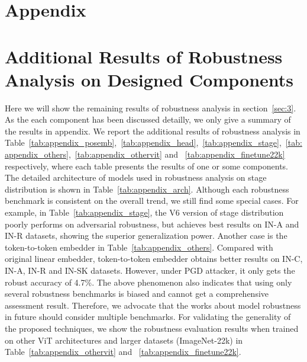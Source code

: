 \documentclass[10pt,twocolumn,letterpaper]{article}
\begin{document}
{\small


}

\clearpage

\appendix

\section*{Appendix}

\section{Additional Results of Robustness Analysis on Designed Components}

Here we will show the remaining results of robustness analysis in section~\ref{sec:3}. As the each component has been discussed detailly, we only give a summary of the results in appendix. We report the additional results of robustness analysis in Table~\ref{tab:appendix_posemb},~\ref{tab:appendix_head},~\ref{tab:appendix_stage},~\ref{tab:appendix_others},~\ref{tab:appendix_othervit} and ~\ref{tab:appendix_finetune22k} respectively, where each table presents the results of one or some components. The detailed architecture of models used in robustness analysis on stage distribution is shown in Table~\ref{tab:appendix_arch}. Although each robustness benchmark is consistent on the overall trend, we still find some special cases. For example, in Table~\ref{tab:appendix_stage}, the V6 version of stage distribution poorly performs on adversarial robustness, but achieves best results on IN-A and IN-R datasets, showing the superior generalization power. Another case is the token-to-token embedder in Table~\ref{tab:appendix_others}. Compared with original linear embedder, token-to-token embedder obtains better results on IN-C, IN-A, IN-R and IN-SK datasets. However, under PGD attacker, it only gets the robust accuracy of 4.7\%. The above phenomenon also indicates that using only several robustness benchmarks is biased and cannot get a comprehensive assessment result. Therefore, we advocate that the works about model robustness in future should consider multiple benchmarks. For validating the generality of the proposed techniques, we show the robustness evaluation results when trained on other ViT architectures and larger datasets (ImageNet-22k) in Table~\ref{tab:appendix_othervit} and ~\ref{tab:appendix_finetune22k}.
\end{document}
